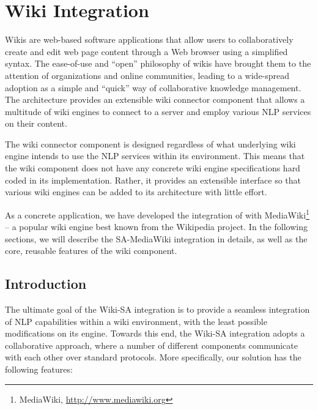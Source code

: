%
%
%   
% 

\chapter{Wiki Integration}
Wikis are web-based software applications that allow users to collaboratively create and edit web page content through a Web browser using a simplified syntax. The ease-of-use and ``open'' philosophy of wikis have brought them to the attention of organizations and online communities, leading to a wide-spread adoption as a simple and ``quick'' way of collaborative knowledge management. The \sa architecture provides an extensible wiki connector component that allows a multitude of wiki engines to connect to a \sa server and employ various NLP services on their content.

The wiki connector component is designed regardless of what underlying wiki engine intends to use the NLP services within its environment. This means that the wiki component does not have any concrete wiki engine specifications hard coded in its implementation. Rather, it provides an extensible interface so that various wiki engines can be added to its architecture with little effort.

As a concrete application, we have developed the integration of \sa with MediaWiki\footnote{MediaWiki, \url{http://www.mediawiki.org}} -- a popular wiki engine best known from the Wikipedia project. In the following sections, we will describe the SA-MediaWiki integration in details, as well as the core, reusable features of the wiki component.

\section{Introduction}
The ultimate goal of the Wiki-SA integration is to provide a seamless integration of NLP capabilities within a wiki environment, with the least possible modifications on its engine. Towards this end, the Wiki-SA integration adopts a collaborative approach, where a number of different components communicate with each other over standard protocols. More specifically, our solution has the following features:

